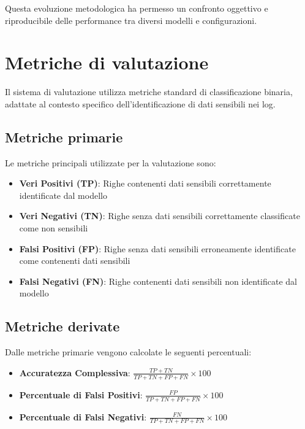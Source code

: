 \documentclass[12pt]{report}
\begin{document}
Questa evoluzione metodologica ha permesso un confronto oggettivo e riproducibile delle performance tra diversi modelli e configurazioni.

\section{Metriche di valutazione}
\label{sec:metriche_test}

Il sistema di valutazione utilizza metriche standard di classificazione binaria, adattate al contesto specifico dell'identificazione di dati sensibili nei log.

\subsection{Metriche primarie}
\label{subsec:metriche_primarie}

Le metriche principali utilizzate per la valutazione sono:

\begin{itemize}
    \item \textbf{Veri Positivi (TP)}: Righe contenenti dati sensibili correttamente identificate dal modello
    \item \textbf{Veri Negativi (TN)}: Righe senza dati sensibili correttamente classificate come non sensibili
    \item \textbf{Falsi Positivi (FP)}: Righe senza dati sensibili erroneamente identificate come contenenti dati sensibili
    \item \textbf{Falsi Negativi (FN)}: Righe contenenti dati sensibili non identificate dal modello
\end{itemize}

\subsection{Metriche derivate}
\label{subsec:metriche_derivate}

Dalle metriche primarie vengono calcolate le seguenti percentuali:

\begin{itemize}
    \item \textbf{Accuratezza Complessiva}: $\frac{TP + TN}{TP + TN + FP + FN} \times 100$
    \item \textbf{Percentuale di Falsi Positivi}: $\frac{FP}{TP + TN + FP + FN} \times 100$
    \item \textbf{Percentuale di Falsi Negativi}: $\frac{FN}{TP + TN + FP + FN} \times 100$
\end{itemize}
\end{document}
